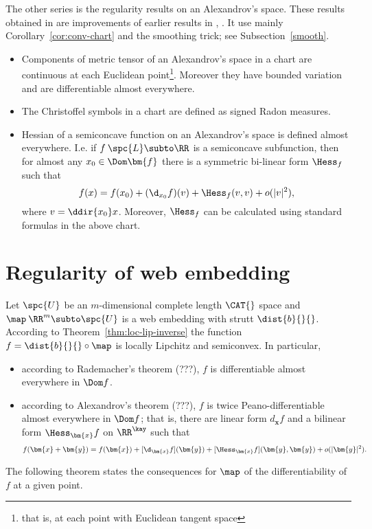 The other series is the regularity results on an Alexandrov's space. 
These results obtained in \cite{perelman:DC} are improvements of earlier results in \cite{otsu-shioya}, \cite{otsu:second-der}. 
It use mainly
Corollary~\ref{cor:conv-chart} and the smoothing trick; see Subsection~\ref{smooth}. 
\begin{itemize}
\item Components of metric tensor of an Alexandrov's space in a chart are continuous
at each Euclidean point\footnote{that is, at each point with Euclidean tangent
space}. 
Moreover they have bounded variation and are differentiable almost everywhere.
\item The Christoffel symbols  in a chart are defined as signed Radon measures.
\item Hessian of a semiconcave function on an Alexandrov's space is defined almost
everywhere. I.e. if $f\:\spc{L}\subto\RR$ is a semiconcave subfunction, then for almost
any $x_0\in \Dom\bm{f}$ there is a symmetric bi-linear form $\Hess_f$ such that
\[f(x)=f(x_0)+(\d_{x_0}f)(v)+\Hess_f(v,v)+o(|v|^2),\]
where $v=\ddir{x_0}x$. 
Moreover, $\Hess_f$ can be calculated using  standard formulas in the above
chart.
\end{itemize}








\section{Regularity of web embedding}\label{sec:web-embedding}

Let $\spc{U}$ be an $m$-dimensional complete length $\CAT{}$ space
and $\map\:\RR^m\subto \spc{U}$ is a web embedding with strutt
$\dist{b}{}{}$.
According to Theorem~\ref{thm:loc-lip-inverse} the function $f=\dist{b}{}{}\circ\map$ is locally Lipchitz and semiconvex.
In particular, 
\begin{itemize}
\item according to Rademacher's theorem (???), $f$ is differentiable almost everywhere in $\Dom f$.
\item according to Alexandrov's theorem (???), 
$f$ is twice Peano-differentiable almost everywhere in $\Dom f$;
that is, there are 
linear form $d_{\bm{x}}f$ 
and a bilinear form $\Hess_{\bm{x}}f$ 
on $\RR^\kay$ 
such that
\[f(\bm{x}+\bm{y})
=
f(\bm{x})+[\d_{\bm{x}}f](\bm{y})+[\Hess_{\bm{x}}f](\bm{y},\bm{y})
+o(|\bm{y}|^2).\] 
\end{itemize}
The following theorem states the consequences for $\map$ 
of the differentiability of $f$ at a given point. 



